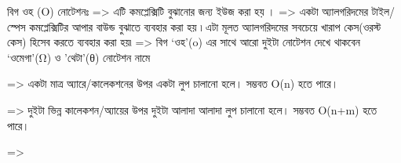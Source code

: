     বিগ ওহ (O) নোটেশনঃ
=> এটি কমপ্লেক্সিটি বুঝানোর জন্য ইউজ করা হয় ।
=> একটা অ্যালগরিদমের টাইল/স্পেস কমপ্লেক্সিটির আপার বাউন্ড বুঝাতে ব্যবহার করা হয় ৷ 
   এটা মূলত অ্যালগরিদমের সবচেয়ে খারাপ কেস(ওরস্ট কেস) হিসেব করতে ব্যবহার করা হয়৷
=> বিগ ‘ওহ’(o) এর সাথে আরো দুইটা নোটেশন দেখে থাকবেন ‘ওমেগা’(Ω) ও
   'থেটা’(θ) নোটেশন নামে


=> একটা মাত্র অ্যারে/কালেকশনের উপর একটা লুপ চালানো হলে।
    সম্ভবত O(n) হতে পারে।

=> দুইটা ভিন্ন কালেকশন/অ্যায়ের উপর দুইটা আলাদা আলাদা লুপ চালানো হলে।
    সম্ভবত O(n+m) হতে পারে।

=> 